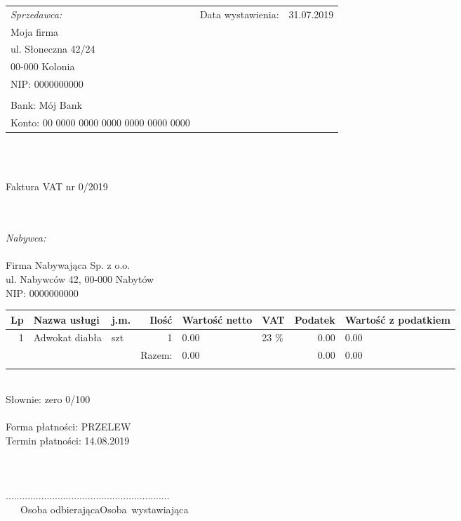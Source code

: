 \documentclass[12pt]{article}
\newcommand{\datawystawienia}{31.07.2019}
\newcommand{\terminplatnosci}{14.08.2019}
\newcommand{\nrfaktury}{0/2019}
\newcommand{\netto}{0.00}
\newcommand{\vat}{0.00}
\newcommand{\brutto}{0.00}
\newcommand{\slownie}{zero 0/100}
\newcommand{\product}{Adwokat diabła}
\begin{document}
\begin{tabular}{p{} l l}
    \textit{Sprzedawca:} & Data wystawienia: & \datawystawienia \\
    Moja firma & & \\
    ul. Słoneczna 42/24 & & \\
    00-000 Kolonia & & \\
    NIP: 0000000000 & & \\ 
                   & & \\
    Bank: Mój Bank & & \\
    Konto: 00 0000 0000 0000 0000 0000 0000 & & \\
\end{tabular}
\ \\ \ \\
\centerline{\hspace{50pt}\LARGE{Faktura VAT nr \nrfaktury}}\\
\ \\
\textit{Nabywca:} \\
\ \\
Firma Nabywająca Sp. z o.o.\\
ul. Nabywców 42, 00-000 Nabytów\\
NIP: 0000000000\\

\begin{tabular}{r p{6cm} l r p{2cm} l r p{2cm}}
    \hline 
    Lp & Nazwa usługi & j.m. & Ilość & Wartość netto
    & VAT & Podatek & Wartość z podatkiem \\ 
    \hline
    1 & \product & szt & 1 & \netto & 23 \% & \vat & \brutto \\
    \hline
    & & & Razem: & \netto & & \vat & \brutto \\
    \\
\end{tabular}

\ \\
Słownie: \slownie\\
\ \\
Forma płatności: PRZELEW \\
Termin płatności: \terminplatnosci \\


\ \\ \ \\ \ \\
..............................\hspace{220pt}..............................\\
\ \ \ Osoba odbierająca\hspace{225pt}\mbox{Osoba wystawiająca}
\end{document}
